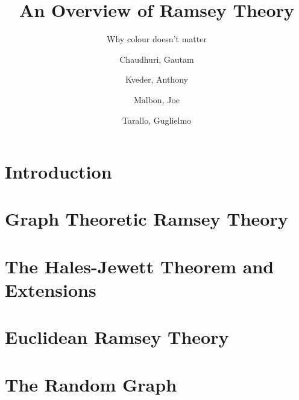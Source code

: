 \documentclass{beamer}
\author{
  Chaudhuri, Gautam\\
  \and
  Kveder, Anthony\\
  \and
  Malbon, Joe\\
  \and
  Tarallo, Guglielmo\\
}
\title{An Overview of Ramsey Theory}
\subtitle{Why colour doesn't matter}
\theoremstyle{BreakBold}
\begin{document}
\frame{\titlepage}

\section{Introduction}

\section{Graph Theoretic Ramsey Theory}


\section{The Hales-Jewett Theorem and Extensions}


\section{Euclidean Ramsey Theory}


\section{The Random Graph}

\end{document}

